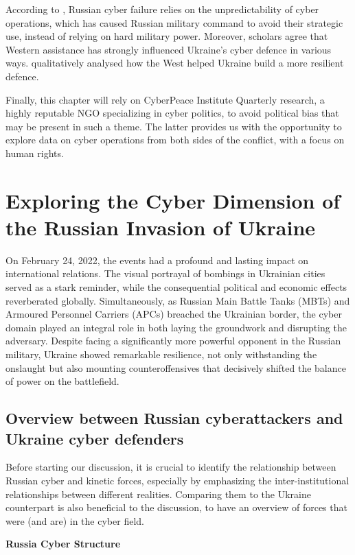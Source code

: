 According to \textcite{lin_2022_russian}, Russian cyber failure relies on the unpredictability of cyber operations, which has caused Russian military command to avoid their strategic use, instead of relying on hard military power. Moreover, scholars agree that Western assistance has strongly influenced Ukraine's cyber defence in various ways. \textcite{beecroft_2022_evaluating} qualitatively analysed how the West helped Ukraine build a more resilient defence.

Finally, this chapter will rely on CyberPeace Institute Quarterly research, a highly reputable NGO specializing in cyber politics, to avoid political bias that may be present in such a theme. The latter provides us with the opportunity to explore data on cyber operations from both sides of the conflict, with a focus on human rights.

\section{Exploring the Cyber Dimension of the Russian Invasion of Ukraine}

On February 24, 2022, the events had a profound and lasting impact on international relations. The visual portrayal of bombings in Ukrainian cities served as a stark reminder, while the consequential political and economic effects reverberated globally. Simultaneously, as Russian Main Battle Tanks (MBTs) and Armoured Personnel Carriers (APCs) breached the Ukrainian border, the cyber domain played an integral role in both laying the groundwork and disrupting the adversary. Despite facing a significantly more powerful opponent in the Russian military, Ukraine showed remarkable resilience, not only withstanding the onslaught but also mounting counteroffensives that decisively shifted the balance of power on the battlefield.

\subsection{Overview between Russian cyberattackers and Ukraine cyber defenders}
Before starting our discussion, it is crucial to identify the relationship between Russian cyber and kinetic forces, especially by emphasizing the inter-institutional relationships between different realities. Comparing them to the Ukraine counterpart is also beneficial to the discussion, to have an overview of forces that were (and are) in the cyber field.  

\textbf{Russia Cyber Structure}


